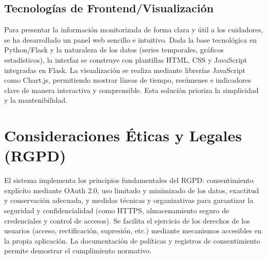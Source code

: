 \subsection{Tecnologías de Frontend/Visualización}
\label{subsec:ea_frontend_viz}

Para presentar la información monitorizada de forma clara y útil a los cuidadores, se ha desarrollado un panel web sencillo e intuitivo. Dada la base tecnológica en Python/Flask y la naturaleza de los datos (series temporales, gráficos estadísticos), la interfaz se construye con plantillas HTML, CSS y JavaScript integradas en Flask. La visualización se realiza mediante librerías JavaScript como Chart.js, permitiendo mostrar líneas de tiempo, resúmenes e indicadores clave de manera interactiva y comprensible. Esta solución prioriza la simplicidad y la mantenibilidad.

\section{Consideraciones Éticas y Legales (RGPD)}
\label{sec:ea_rgpd}

El sistema implementa los principios fundamentales del RGPD: consentimiento explícito mediante OAuth 2.0, uso limitado y minimizado de los datos, exactitud y conservación adecuada, y medidas técnicas y organizativas para garantizar la seguridad y confidencialidad (como HTTPS, almacenamiento seguro de credenciales y control de accesos). Se facilita el ejercicio de los derechos de los usuarios (acceso, rectificación, supresión, etc.) mediante mecanismos accesibles en la propia aplicación. La documentación de políticas y registros de consentimiento permite demostrar el cumplimiento normativo.